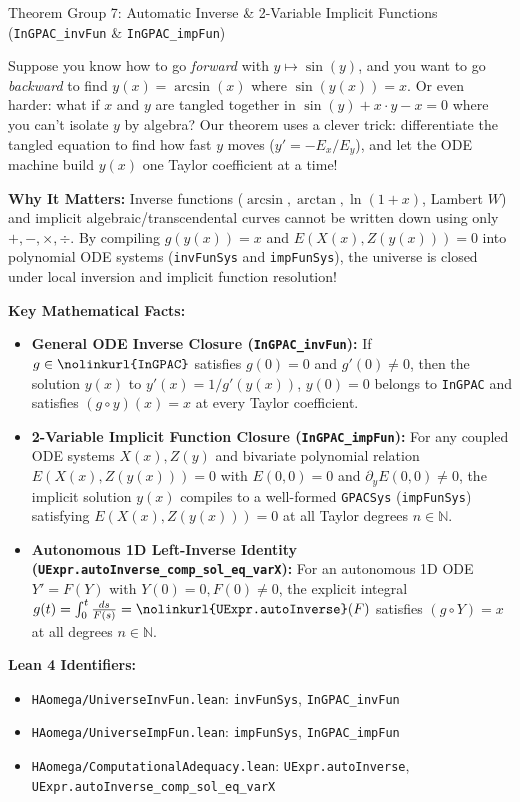\documentclass[11pt,a4paper]{article}
\newcommand{\N}{\ensuremath{\mathbb{N}}}
\newcommand{\lean}[1]{\texttt{\nolinkurl{#1}}}
\begin{document}
\begin{thmcard}{Theorem Group 7: Automatic Inverse \& 2-Variable Implicit Functions (\lean{InGPAC\_invFun} \& \lean{InGPAC\_impFun})}
\begin{eli5box}
Suppose you know how to go \emph{forward} with $y \mapsto \sin(y)$, and you want to go \emph{backward} to find $y(x) = \arcsin(x)$ where $\sin(y(x)) = x$. Or even harder: what if $x$ and $y$ are tangled together in $\sin(y) + x \cdot y - x = 0$ where you can't isolate $y$ by algebra? Our theorem uses a clever trick: differentiate the tangled equation to find how fast $y$ moves ($y' = -E_x / E_y$), and let the ODE machine build $y(x)$ one Taylor coefficient at a time!
\end{eli5box}

\textbf{Why It Matters:}
Inverse functions ($\arcsin, \arctan, \ln(1+x)$, Lambert $W$) and implicit algebraic/transcendental curves cannot be written down using only $+,-,\times,\div$. By compiling $g(y(x)) = x$ and $E(X(x), Z(y(x))) = 0$ into polynomial ODE systems (\lean{invFunSys} and \lean{impFunSys}), the universe is closed under local inversion and implicit function resolution!

\textbf{Key Mathematical Facts:}
\begin{itemize}
  \item \textbf{General ODE Inverse Closure (\lean{InGPAC_invFun}):} If $g \in \lean{InGPAC}$ satisfies $g(0)=0$ and $g'(0) \neq 0$, then the solution $y(x)$ to $y'(x) = 1 / g'(y(x))$, $y(0)=0$ belongs to \lean{InGPAC} and satisfies $(g \circ y)(x) = x$ at every Taylor coefficient.
  \item \textbf{2-Variable Implicit Function Closure (\lean{InGPAC_impFun}):} For any coupled ODE systems $X(x), Z(y)$ and bivariate polynomial relation $E(X(x), Z(y(x))) = 0$ with $E(0,0)=0$ and $\partial_y E(0,0) \neq 0$, the implicit solution $y(x)$ compiles to a well-formed \lean{GPACSys} (\lean{impFunSys}) satisfying $E(X(x), Z(y(x))) = 0$ at all Taylor degrees $n \in \N$.
  \item \textbf{Autonomous 1D Left-Inverse Identity (\lean{UExpr.autoInverse_comp_sol_eq_varX}):} For an autonomous 1D ODE $Y' = F(Y)$ with $Y(0)=0, F(0)\neq 0$, the explicit integral $g(t) = \int_0^t \frac{ds}{F(s)} = \lean{UExpr.autoInverse}(F)$ satisfies $(g \circ Y) = x$ at all degrees $n \in \N$.
\end{itemize}

\textbf{Lean 4 Identifiers:}
\begin{itemize}
  \item \lean{HAomega/UniverseInvFun.lean}: \lean{invFunSys}, \lean{InGPAC_invFun}
  \item \lean{HAomega/UniverseImpFun.lean}: \lean{impFunSys}, \lean{InGPAC_impFun}
  \item \lean{HAomega/ComputationalAdequacy.lean}: \lean{UExpr.autoInverse}, \lean{UExpr.autoInverse_comp_sol_eq_varX}
\end{itemize}
\end{thmcard}
\end{document}
